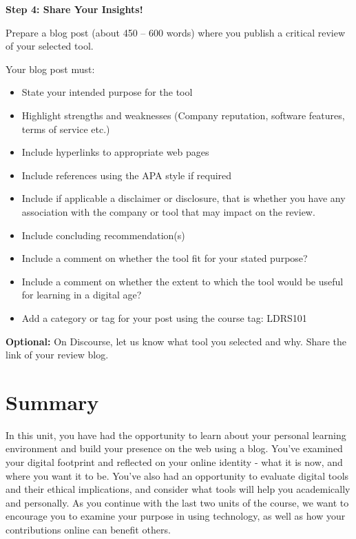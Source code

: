 \documentclass[
]{book}
\providecommand{\tightlist}{%
  \setlength{\itemsep}{0pt}\setlength{\parskip}{0pt}}
\theoremstyle{definition}
\theoremstyle{definition}
\theoremstyle{definition}
\theoremstyle{definition}
\theoremstyle{remark}
\begin{document}
\begin{reflect}
\textbf{Step 4: Share Your Insights!}

Prepare a blog post (about 450 -- 600 words) where you publish a critical review of your selected tool.

Your blog post must:

\begin{itemize}
\tightlist
\item
  State your intended purpose for the tool\\
\item
  Highlight strengths and weaknesses (Company reputation, software features, terms of service etc.)\\
\item
  Include hyperlinks to appropriate web pages\\
\item
  Include references using the APA style if required\\
\item
  Include if applicable a disclaimer or disclosure, that is whether you have any association with the company or tool that may impact on the review.\\
\item
  Include concluding recommendation(s)\\
\item
  Include a comment on whether the tool fit for your stated purpose?\\
\item
  Include a comment on whether the extent to which the tool would be useful for learning in a digital age?\\
\item
  Add a category or tag for your post using the course tag: LDRS101
\end{itemize}

\textbf{Optional:} On Discourse, let us know what tool you selected and why. Share the link of your review blog.
\end{reflect}

\hypertarget{summary-3}{%
\section*{Summary}\label{summary-3}}

In this unit, you have had the opportunity to learn about your personal learning environment and build your presence on the web using a blog. You've examined your digital footprint and reflected on your online identity - what it is now, and where you want it to be. You've also had an opportunity to evaluate digital tools and their ethical implications, and consider what tools will help you academically and personally. As you continue with the last two units of the course, we want to encourage you to examine your purpose in using technology, as well as how your contributions online can benefit others.
\end{document}
